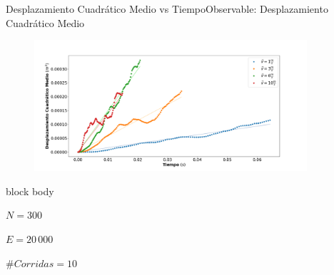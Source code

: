 \documentclass{beamer}
\begin{document}
            \begin{frame}{Desplazamiento Cuadrático Medio vs Tiempo}{Observable: Desplazamiento Cuadrático Medio}
                \begin{figure}[H!]
                    \includegraphics[width=0.9\textwidth]{./dcm_vs_time}
                    \label{fig:dcm_2}
                \end{figure}
                \begin{beamercolorbox}[sep=5pt,center]{block body}
                    \begin{minipage}[t]{0.3\textwidth}
                        \centering
                        \small{$N=300$}
                    \end{minipage}
                    \hfill
                    \begin{minipage}[t]{0.3\textwidth}
                        \centering
                        \small{$E=20\,000$}
                    \end{minipage}
                    \hfill
                    \begin{minipage}[t]{0.3\textwidth}
                        \centering
                        \small{$\#Corridas = 10$}
                    \end{minipage}
                \end{beamercolorbox}
            \end{frame}
\end{document}
